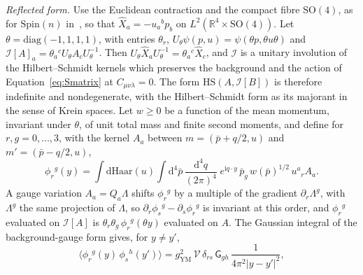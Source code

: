 \emph{Reflected form.} Use the Euclidean contraction and the compact fibre \(\mathrm{SO}(4)\), as for \(\mathrm{Spin}(n)\) in~\cite{Hanada2006}, so that \(\hat X_a=-u_a{}^bp_b\) on \(L^2(\mathbb R^4\times\mathrm{SO}(4))\). Let \(\theta=\mathrm{diag}(-1,1,1,1)\), with entries \(\theta_r\), \(U_\theta\psi(p,u)=\psi(\theta p,\theta u\theta)\) and \(\mathcal I[A]_a=\theta_a{}^cU_\theta A_cU_\theta^{-1}\). Then \(U_\theta\hat X_aU_\theta^{-1}=\theta_a{}^c\hat X_c\), and \(\mathcal I\) is a unitary involution of the Hilbert--Schmidt kernels which preserves the background and the action of Equation~\eqref{eq:Smatrix} at \(C_{\mu\nu\lambda}=0\). The form \(\mathrm{HS}(A,\mathcal I[B])\) is therefore indefinite and nondegenerate, with the Hilbert--Schmidt form as its majorant in the sense of Krein spaces. Let \(w\ge0\) be a function of the mean momentum, invariant under \(\theta\), of unit total mass and finite second moments, and define for \(r,g=0,\dots,3\), with the kernel \(A_a\) between \(m=(\bar p+q/2,u)\) and \(m'=(\bar p-q/2,u)\),
\[
\phi_r{}^g(y)=\int\mathrm d\mathrm{Haar}(u)\int\mathrm d^4\bar p\,\frac{\mathrm d^4q}{(2\pi)^4}\;e^{\mathrm iq\cdot y}\,\bar p_g\,w(\bar p)^{1/2}\,u^a{}_rA_a.
\]
A gauge variation \(A_a=Q_a\Lambda\) shifts \(\phi_r{}^g\) by a multiple of the gradient \(\partial_r\Lambda^g\), with \(\Lambda^g\) the same projection of \(\Lambda\), so \(\partial_r\phi_s{}^g-\partial_s\phi_r{}^g\) is invariant at this order, and \(\phi_r{}^g\) evaluated on \(\mathcal I[A]\) is \(\theta_r\theta_g\,\phi_r{}^g(\theta y)\) evaluated on \(A\). The Gaussian integral of the background-gauge form gives, for \(y\neq y'\),
\[
\bigl\langle\phi_r{}^g(y)\,\phi_s{}^h(y')\bigr\rangle=g_{\mathrm{YM}}^2\,\mathcal V\,\delta_{rs}\,\mathsf G_{gh}\,\frac1{4\pi^2|y-y'|^2},
\]
